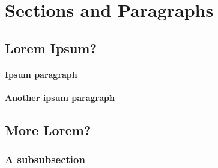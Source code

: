 
\section{Sections and Paragraphs} %
\label{sec:sections_and_paragraphs}

\subsection{Lorem Ipsum?} %
\label{sub:lorem_ipsum_}

\paragraph{Ipsum paragraph} %
\label{par:ipsum_paragraph}
\lipsum[1-1]

\paragraph{Another ipsum paragraph} %
\label{par:another_ipsum_paragraph}
\lipsum[1-1]


\subsection{More Lorem?} %
\label{sub:more_lorem_}

\subsubsection{A subsubsection}
\lipsum[1-1]


